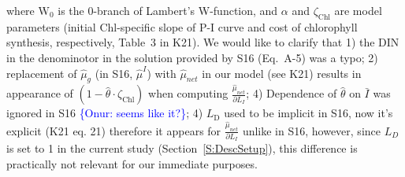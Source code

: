 \documentclass[gmd, manuscript]{copernicus}
\newcommand{\onur}[1]{\textcolor{blue}{\{Onur: #1\}}}
\begin{document}
where $\mathrm{W}_{0}$ is the 0-branch of Lambert's W-function, and $\alpha$ and $\zeta_{\text{Chl}}$ are model parameters (initial Chl-specific slope of P-I curve and cost of chlorophyll synthesis, respectively, Table~3 in K21). We would like to clarify that 1) the DIN in the denominotor in the solution provided by S16 (Eq.~A-5) was a typo; 2) replacement of $\hat{\mu}_g$ (in S16, $\hat{\mu}^I$) with $\hat{\mu}_{net}$ in our model (see K21) results in appearance of $(1-\hat{\theta} \cdot \zeta_{\text{Chl}})$ when computing $\frac{\hat{\mu}_{net}}{\partial L_I}$; 4) Dependence of $\hat{\theta}$ on $\bar{I}$ was ignored in S16 \onur{seems like it?}; 4) $L_{\text{D}}$ used to be implicit in S16, now it's explicit (K21 eq. 21) therefore it appears for $\frac{\hat{\mu}_{net}}{\partial L_I}$ unlike in S16, however, since $L_D$ is set to 1 in the current study (Section~\ref{S:DescSetup}), this difference is practically not relevant for our immediate purposes.\\ 
\end{document}

